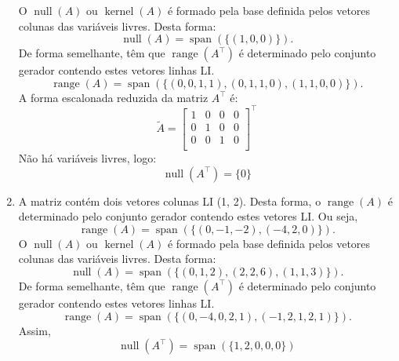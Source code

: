 \begin{resolution}
\begin{enumerate}[label=\alph*)]
\begin{equation}
          \end{equation}
          O $\operatorname{null}(A)$ ou $\operatorname{kernel}(A)$ é formado pela base definida pelos vetores colunas das variáveis livres. Desta forma:
          \begin{equation}
            \operatorname{null}(A) = \operatorname{span} (\{(1, 0, 0)\}).
          \end{equation}
          De forma semelhante, têm que $\operatorname{range}(A^{\top})$ é determinado pelo conjunto gerador contendo estes vetores linhas LI.
          \begin{equation}
            \operatorname{range}(A) = \operatorname{span} (\{(0, 0, 1, 1), (0, 1, 1, 0), (1, 1, 0, 0)\}).
          \end{equation}
          A forma escalonada reduzida da matriz $A^{\top}$ é:
          \begin{equation}
            \tilde A =\begin{bmatrix}
              1 & 0 & 0 & 0 \\
              0 & 1 & 0 & 0 \\
              0 & 0 & 1 & 0 \\
            \end{bmatrix} ^{\top}
          \end{equation}
          Não há variáveis livres, logo:
          \begin{equation}
            \operatorname{null}(A^{\top}) = \{0\}
          \end{equation}

    \item A matriz contém dois vetores colunas LI (1, 2). Desta forma, o $\operatorname{range}(A)$ é determinado pelo conjunto gerador contendo estes vetores LI. Ou seja,
          \begin{equation}
            \operatorname{range}(A) = \operatorname{span} (\{(0, -1, -2), (-4, 2, 0)\}).
          \end{equation}
          O $\operatorname{null}(A)$ ou $\operatorname{kernel}(A)$ é formado pela base definida pelos vetores colunas das variáveis livres. Desta forma:
          \begin{equation}
            \operatorname{null}(A) = \operatorname{span} (\{(0, 1, 2), (2, 2, 6), (1, 1, 3)\}).
          \end{equation}
          De forma semelhante, têm que $\operatorname{range}(A^{\top})$ é determinado pelo conjunto gerador contendo estes vetores linhas LI.
          \begin{equation}
            \operatorname{range}(A) = \operatorname{span} (\{(0, -4, 0, 2, 1), (-1, 2, 1, 2, 1)\}).
          \end{equation}
          Assim,
          \begin{equation}
            \operatorname{null}(A^{\top}) = \operatorname{span}(\{1, 2, 0, 0, 0\})
          \end{equation}
  \end{enumerate}
\end{resolution}

